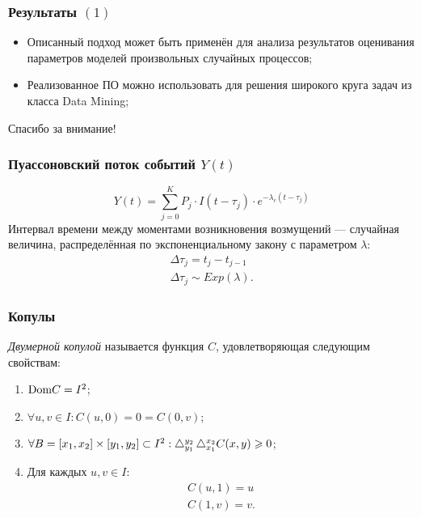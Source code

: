 \documentclass[11pt]{beamer}
\begin{document}
\begin{frame}
\begin{center}
\frametitle{Результаты $(1)$}
\begin{itemize}
  \item Описанный подход может быть применён для анализа результатов оценивания параметров моделей произвольных случайных процессов;
  \item Реализованное ПО можно использовать для решения широкого круга задач из класса Data Mining;
\end{itemize}
\end{center}
\end{frame}

\begin{frame}
\begin{center}
Спасибо за внимание!
\end{center}
\end{frame}

\begin{frame}
\frametitle{Пуассоновский поток событий $Y(t)$}
\[Y(t) = \sum_{j = 0}^K P_j \cdot I(t - \tau_j) \cdot e^{-\lambda_c(t - \tau_j)}\]
Интервал времени между моментами возникновения возмущений --- случайная величина, распределённая по экспоненциальному закону с параметром $\lambda$:
\begin{gather}
\Delta \tau_j = t_j - t_{j-1} \\
\Delta \tau_j \sim Exp(\lambda).
\end{gather}
\end{frame}

\begin{frame}
\frametitle{Копулы}
\emph{Двумерной копулой} называется функция $C$, удовлетворяющая следующим свойствам:
\begin{enumerate}
\item $\mathrm{Dom}{C} = I^2$;
\item $\forall u,v \in I : C(u, 0) = 0 = C(0, v)$;
\item $\forall B = [x_1, x_2] \times [y_1, y_2] \subset I^2 : \mathop{}\!\mathbin\bigtriangleup_{y_1}^{y_2}\mathop{}\!\mathbin\bigtriangleup_{x_1}^{x_2}C(x, y) \geqslant 0$;
\item Для каждых $u, v \in I$:
  \begin{gather}
    C(u, 1) = u \\
    C(1, v) = v.
  \end{gather}
\end{enumerate}
\end{frame}
\end{document}
